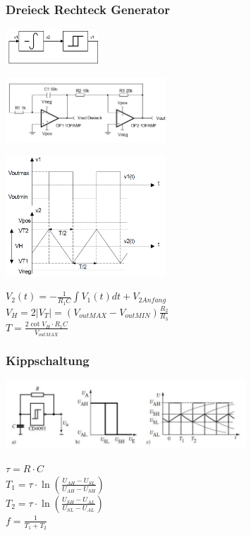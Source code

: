 \subsubsection{Dreieck Rechteck Generator}
	\begin{multicols}{3}
		\begin{center}
			\includegraphics[width=3.5cm]{./bilder/osziDreieckRechteckBlock.png}\\
		\end{center}
		\includegraphics[width=6cm]{./bilder/osziDreieckRechteck.png}
		\columnbreak
		
		\includegraphics[width=6cm]{./bilder/osziDreieckRechteckSignal.png}
		\columnbreak
			
		$V_2\left(t\right)=-\frac{1}{R_1C}\int V_1\left(t\right)dt+V_{2 Anfang}$\\
		$V_H=2\left|V_T\right|=\left(V_{outMAX}-V_{outMIN}\right)\frac{R_2}{R_3}$\\
		$T=\frac{2\cot V_H \cdot R_1C}{V_{outMAX}}$\\
	\end{multicols}
\subsubsection{Kippschaltung}
	\begin{minipage}{9cm}
		\includegraphics[width=9cm]{./bilder/kippschaltung}
	\end{minipage}
	\begin{minipage}{6cm}
		$\tau = R \cdot C $\\
		$T_1 = \tau \cdot \ln \left(\frac{U_{AH}-U_{SL}}{U_{AH}-U_{SH}} \right)$ \\
		$T_2 = \tau \cdot \ln \left(\frac{U_{SH}-U_{AL}}{U_{SL}-U_{AL}} \right)$ \\
		$f = \frac{1}{T_1 + T_2}$
	\end{minipage}
